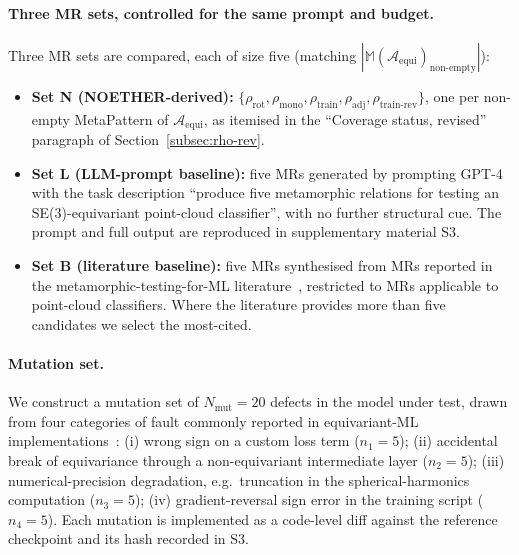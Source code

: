 \documentclass[acmsmall,screen,review]{acmart}
\begin{document}
\paragraph{Three MR sets, controlled for the same prompt and budget.}
Three MR sets are compared, each of size five (matching $|\mathbb{M}(\mathcal{A}_{\mathrm{equi}})_{\mathrm{non\text{-}empty}}|$):
\begin{itemize}
    \item \textbf{Set N (NOETHER-derived):} $\{\rho_{\mathrm{rot}},\rho_{\mathrm{mono}},\rho_{\mathrm{train}},\rho_{\mathrm{adj}},\rho_{\mathrm{train\text{-}rev}}\}$, one per non-empty MetaPattern of $\mathcal{A}_{\mathrm{equi}}$, as itemised in the ``Coverage status, revised'' paragraph of Section~\ref{subsec:rho-rev}.
    \item \textbf{Set L (LLM-prompt baseline):} five MRs generated by prompting GPT-4 with the task description ``produce five metamorphic relations for testing an SE(3)-equivariant point-cloud classifier'', with no further structural cue. The prompt and full output are reproduced in supplementary material S3.
    \item \textbf{Set B (literature baseline):} five MRs synthesised from MRs reported in the metamorphic-testing-for-ML literature~\cite{Segura2016, Shin2024, AutoMT2025}, restricted to MRs applicable to point-cloud classifiers. Where the literature provides more than five candidates we select the most-cited.
\end{itemize}

\paragraph{Mutation set.}
We construct a mutation set of $N_{\mathrm{mut}} = 20$ defects in the model under test, drawn from four categories of fault commonly reported in equivariant-ML implementations~\cite{ThomasSmidt2018}: (i) wrong sign on a custom loss term ($n_1 = 5$); (ii) accidental break of equivariance through a non-equivariant intermediate layer ($n_2 = 5$); (iii) numerical-precision degradation, e.g.\ truncation in the spherical-harmonics computation ($n_3 = 5$); (iv) gradient-reversal sign error in the training script ($n_4 = 5$). Each mutation is implemented as a code-level diff against the reference checkpoint and its hash recorded in S3.
\end{document}
